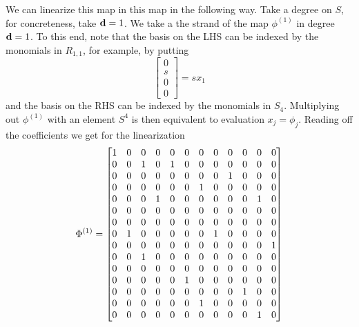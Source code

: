 \documentclass[fleqn,reqno]{amsart}
\begin{document}
\begin{example}[$\mt{ex202}$]
We can linearize this map in this map in the following way.
Take a degree on $S$, for concreteness, take $\mathbf d=1$.
We take a the strand of the map $\phi^{(1)}$ in degree $\mathbf d=1$.
To this end, note that the basis on the LHS can be indexed by the monomials in $R_{1,1}$,
for example, by putting
\[
	\begin{bmatrix}0\\s\\0\\0\end{bmatrix}=sx_1
\]
and the basis on the RHS can be indexed by the monomials in $S_4$.
Multiplying out $\phi^{(1)}$ with an element $S^4$ is then equivalent to evaluation $x_j=\phi_j$.
Reading off the coefficients we get for the linearization
\[
	\Phi^{(1)}=
	\bgroup\makeatletter\c@MaxMatrixCols=12\makeatother\begin{bmatrix}1&
      0&
      0&
      0&
      0&
      0&
      0&
      0&
      0&
      0&
      0&
      0\\
      0&
      0&
      1&
      0&
      1&
      0&
      0&
      0&
      0&
      0&
      0&
      0\\
      0&
      0&
      0&
      0&
      0&
      0&
      0&
      0&
      1&
      0&
      0&
      0\\
      0&
      0&
      0&
      0&
      0&
      0&
      1&
      0&
      0&
      0&
      0&
      0\\
      0&
      0&
      0&
      1&
      0&
      0&
      0&
      0&
      0&
      0&
      1&
      0\\
      0&
      0&
      0&
      0&
      0&
      0&
      0&
      0&
      0&
      0&
      0&
      0\\
      0&
      0&
      0&
      0&
      0&
      0&
      0&
      0&
      0&
      0&
      0&
      0\\
      0&
      1&
      0&
      0&
      0&
      0&
      0&
      1&
      0&
      0&
      0&
      0\\
      0&
      0&
      0&
      0&
      0&
      0&
      0&
      0&
      0&
      0&
      0&
      1\\
      0&
      0&
      1&
      0&
      0&
      0&
      0&
      0&
      0&
      0&
      0&
      0\\
      0&
      0&
      0&
      0&
      0&
      0&
      0&
      0&
      0&
      0&
      0&
      0\\
      0&
      0&
      0&
      0&
      0&
      1&
      0&
      0&
      0&
      0&
      0&
      0\\
      0&
      0&
      0&
      0&
      0&
      0&
      0&
      0&
      0&
      1&
      0&
      0\\
      0&
      0&
      0&
      0&
      0&
      0&
      1&
      0&
      0&
      0&
      0&
      0\\
      0&
      0&
      0&
      0&
      0&
      0&
      0&
      0&
      0&
      0&
      1&
      0\\
      \end{bmatrix}\egroup
\]


\end{example}
\end{document}
